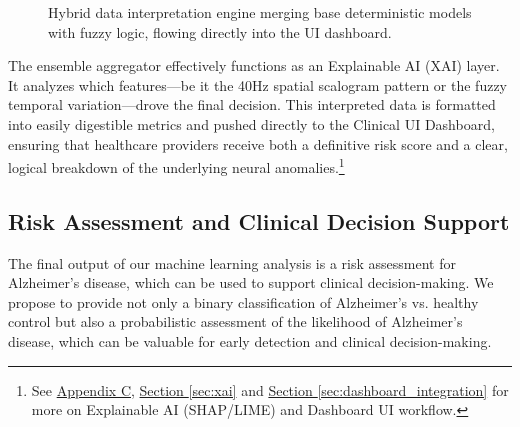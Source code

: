 \documentclass[openany]{book}
\begin{document}
\begin{figure}[htpb]
    \centering
    \caption{Hybrid data interpretation engine merging base deterministic models with fuzzy logic, flowing directly into the UI dashboard.}
    \label{fig:hybrid_interpretation}
\end{figure}

The ensemble aggregator effectively functions as an Explainable AI (XAI) layer. It analyzes which features—be it the 40Hz spatial scalogram pattern or the fuzzy temporal variation—drove the final decision. This interpreted data is formatted into easily digestible metrics and pushed directly to the Clinical UI Dashboard, ensuring that healthcare providers receive both a definitive risk score and a clear, logical breakdown of the underlying neural anomalies.\footnote{See \hyperref[app:C]{Appendix C}, \hyperref[sec:xai]{Section \ref*{sec:xai}} and \hyperref[sec:dashboard_integration]{Section \ref*{sec:dashboard_integration}} for more on Explainable AI (SHAP/LIME) and Dashboard UI workflow.}

\subsection{Risk Assessment and Clinical Decision Support}
The final output of our machine learning analysis is a risk assessment for Alzheimer's disease, which can be used to support clinical decision-making. We propose to provide not only a binary classification of Alzheimer's vs. healthy control but also a probabilistic assessment of the likelihood of Alzheimer's disease, which can be valuable for early detection and clinical decision-making. 
\end{document}
